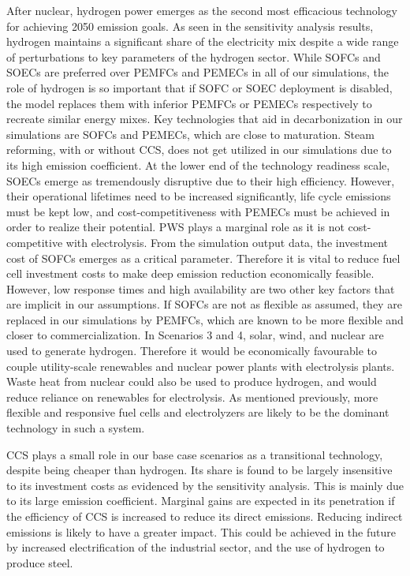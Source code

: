 After nuclear, hydrogen power emerges as the second most efficacious technology for achieving 2050 emission goals. As seen in the sensitivity analysis results, hydrogen maintains a significant share of the electricity mix despite a wide range of perturbations to key parameters of the hydrogen sector. While \gls{SOFC}s and \gls{SOEC}s are preferred over \gls{PEMFC}s and \gls{PEMEC}s in all of our simulations, the role of hydrogen is so important that if \gls{SOFC} or \gls{SOEC} deployment is disabled, the model replaces them with inferior \gls{PEMFC}s or \gls{PEMEC}s respectively to recreate similar energy mixes. Key technologies that aid in decarbonization in our simulations are \gls{SOFC}s and \gls{PEMEC}s, which are close to maturation. Steam reforming, with or without CCS, does not get utilized in our simulations due to its high emission coefficient. At the lower end of the technology readiness scale, \gls{SOEC}s emerge as tremendously disruptive due to their high efficiency. However, their operational lifetimes need to be increased significantly, life cycle emissions must be kept low, and cost-competitiveness with \gls{PEMEC}s must be achieved in order to realize their potential. \gls{PWS} plays a marginal role as it is not cost-competitive with electrolysis. From the simulation output data, the investment cost of \gls{SOFC}s emerges as a critical parameter. Therefore it is vital to reduce fuel cell investment costs to make deep emission reduction economically feasible. However, low response times and high availability are two other key factors that are implicit in our assumptions. If \gls{SOFC}s are not as flexible as assumed, they are replaced in our simulations by \gls{PEMFC}s, which are known to be more flexible and closer to commercialization. In Scenarios 3 and 4, solar, wind, and nuclear are used to generate hydrogen. Therefore it would be economically favourable to couple utility-scale renewables and nuclear power plants with electrolysis plants. Waste heat from nuclear could also be used to produce hydrogen, and would reduce reliance on renewables for electrolysis. As mentioned previously, more flexible and responsive fuel cells and electrolyzers are likely to be the dominant technology in such a system.

CCS plays a small role in our base case scenarios as a transitional technology, despite being cheaper than hydrogen. Its share is found to be largely insensitive to its investment costs as evidenced by the sensitivity analysis. This is mainly due to its large emission coefficient. Marginal gains are expected in its penetration if the efficiency of CCS is increased to reduce its direct emissions. Reducing indirect emissions is likely to have a greater impact. This could be achieved in the future by increased electrification of the industrial sector, and the use of hydrogen to produce steel.

